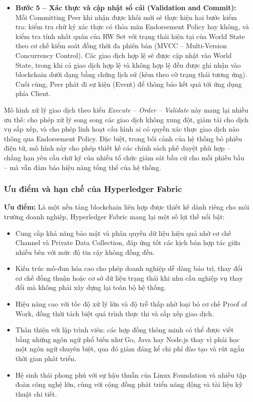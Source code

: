 \begin{itemize}
    \item \textbf{Bước 5 -- Xác thực và cập nhật sổ cái (Validation and Commit):} Mỗi Committing Peer khi nhận được khối mới sẽ thực hiện hai bước kiểm tra: kiểm tra chữ ký xác thực có thỏa mãn Endorsement Policy hay không, và kiểm tra tính nhất quán của RW Set với trạng thái hiện tại của World State theo cơ chế kiểm soát đồng thời đa phiên bản (MVCC -- Multi-Version Concurrency Control). Các giao dịch hợp lệ sẽ được cập nhật vào World State, trong khi cả giao dịch hợp lệ và không hợp lệ đều được ghi nhận vào blockchain dưới dạng bằng chứng lịch sử (kèm theo cờ trạng thái tương ứng). Cuối cùng, Peer phát đi sự kiện (Event) để thông báo kết quả tới ứng dụng phía Client.
\end{itemize}

Mô hình xử lý giao dịch theo kiểu \textit{Execute -- Order -- Validate} này mang lại nhiều ưu thế: cho phép xử lý song song các giao dịch không xung đột, giảm tải cho dịch vụ sắp xếp, và cho phép linh hoạt cấu hình ai có quyền xác thực giao dịch nào thông qua Endorsement Policy. Đặc biệt, trong bối cảnh của hệ thống bỏ phiếu điện tử, mô hình này cho phép thiết kế các chính sách phê duyệt phù hợp -- chẳng hạn yêu cầu chữ ký của nhiều tổ chức giám sát bầu cử cho mỗi phiếu bầu -- mà vẫn đảm bảo hiệu năng tổng thể của hệ thống.

\subsubsection{Ưu điểm và hạn chế của Hyperledger Fabric}

\textbf{Ưu điểm:} Là một nền tảng blockchain liên hợp được thiết kế dành riêng cho môi trường doanh nghiệp, Hyperledger Fabric mang lại một số lợi thế nổi bật:

\begin{itemize}
    \item Cung cấp khả năng bảo mật và phân quyền dữ liệu hiệu quả nhờ cơ chế Channel và Private Data Collection, đáp ứng tốt các kịch bản hợp tác giữa nhiều bên với mức độ tin cậy không đồng đều.

    \item Kiến trúc mô-đun hóa cao cho phép doanh nghiệp dễ dàng bảo trì, thay đổi cơ chế đồng thuận hoặc cơ sở dữ liệu trạng thái khi nhu cầu nghiệp vụ thay đổi mà không phải xây dựng lại toàn bộ hệ thống.

    \item Hiệu năng cao với tốc độ xử lý lớn và độ trễ thấp nhờ loại bỏ cơ chế Proof of Work, đồng thời tách biệt quá trình thực thi và sắp xếp giao dịch.

    \item Thân thiện với lập trình viên: các hợp đồng thông minh có thể được viết bằng những ngôn ngữ phổ biến như Go, Java hay Node.js thay vì phải học một ngôn ngữ chuyên biệt, qua đó giảm đáng kể chi phí đào tạo và rút ngắn thời gian phát triển.

    \item Hệ sinh thái phong phú với sự hậu thuẫn của Linux Foundation và nhiều tập đoàn công nghệ lớn, cùng với cộng đồng phát triển năng động và tài liệu kỹ thuật chi tiết.
\end{itemize}

